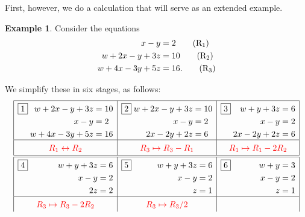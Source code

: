 \documentclass[a4paper]{book}
\theoremstyle{definition}
\newtheorem{example}[theorem]{Example}
\begin{document}
First, however, we do a calculation that will serve as an extended
example.
\begin{example}
 Consider the equations
 \begin{align*}
  x-y       &= 2   \tag{R${}_1$}\\
  w+2x-y+3z &= 10  \tag{R${}_2$}\\
  w+4x-3y+5z&= 16. \tag{R${}_3$}
 \end{align*}

 We simplify these in six stages, as follows:
 {\small \[
 \renewcommand{\arraystretch}{1.5}
  \begin{array}{|c|c|c|}
 \hline 
 \framebox{1}\;\hfill
 \begin{aligned}[t]
  w+2x-y+3z &= 10  \\
  x-y       &= 2   \\
  w+4x-3y+5z&= 16
 \end{aligned} &
 \framebox{2}\;\hfill
 \begin{aligned}[t]
  w+2x-y+3z &= 10  \\
  x-y       &= 2   \\
  2x-2y+2z   &= 6
 \end{aligned} &
 \framebox{3}\;\hfill
 \begin{aligned}[t]
  w+y+3z &= 6  \\
  x-y    &= 2   \\
  2x-2y+2z   &= 6
 \end{aligned} \\
 \hline
 \RED{R_1\leftrightarrow R_2} & 
 \RED{R_3\mapsto R_3-R_1} &
 \RED{R_1 \mapsto R_1-2R_2} \\
 \hline\hline 
 \framebox{4}\;\hfill
 \begin{aligned}[t]
  w+y+3z &= 6  \\
  x-y    &= 2   \\
  2z   &= 2
 \end{aligned} &
 \framebox{5}\;\hfill
 \begin{aligned}[t]
  w+y+3z &= 6  \\
  x-y &= 2   \\
  z   &= 1
 \end{aligned} &
 \framebox{6}\;\hfill
 \begin{aligned}[t]
  w+y &= 3  \\
  x-y &= 2   \\
  z   &= 1
 \end{aligned} \\
 \hline
 \RED{R_3 \mapsto R_3-2R_2} &
 \RED{R_3 \mapsto R_3/2} &

\end{array}\]}
\end{example}
\end{document}
